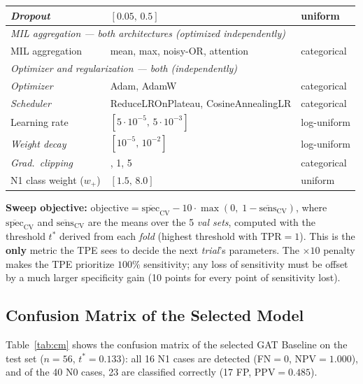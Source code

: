 \documentclass[10pt,a4paper,twocolumn,twoside]{article}
\begin{document}
\begin{table}[H]
\begin{tabular}{p{5.0cm}>{\raggedleft\arraybackslash}p{5.3cm}>{\raggedleft\arraybackslash}p{3.0cm}}
\textit{Dropout}                            & $[0.05,\,0.5]$                         & uniform \\
\midrule
\multicolumn{3}{l}{\textit{MIL aggregation --- both architectures (optimized independently)}} \\[2pt]
MIL aggregation                               & mean, max, noisy-OR, attention             & categorical \\
\midrule
\multicolumn{3}{l}{\textit{Optimizer and regularization --- both (independently)}} \\[2pt]
\textit{Optimizer}                          & Adam, AdamW                                & categorical \\
\textit{Scheduler}                          & ReduceLROnPlateau, CosineAnnealingLR       & categorical \\
Learning rate                           & $[5\cdot10^{-5},\,5\cdot10^{-3}]$         & log-uniform \\
\textit{Weight decay}                       & $[10^{-5},\,10^{-2}]$                      & log-uniform \\
\textit{Grad.\ clipping}                     & 0, 1, 5                                    & categorical \\
N1 class weight ($w_+$)                       & $[1.5,\,8.0]$                          & uniform \\
\bottomrule
\end{tabular}
\end{table}

\textbf{Sweep objective:}
$\text{objective} = \overline{\text{spec}}_{\text{CV}} - 10 \cdot \max(0,\; 1 - \overline{\text{sens}}_{\text{CV}})$,
where $\overline{\text{spec}}_{\text{CV}}$ and $\overline{\text{sens}}_{\text{CV}}$ are the means
over the 5 \textit{val sets}, computed with the threshold $t^*$ derived from each \textit{fold}
(highest threshold with TPR$=1$). This is the \textbf{only} metric the TPE sees to decide
the next \textit{trial}'s parameters. The $\times 10$ penalty makes the TPE prioritize
$100\%$ sensitivity; any loss of sensitivity must be offset
by a much larger specificity gain (10 points for every point of sensitivity lost).

\subsection{Confusion Matrix of the Selected Model}
\label{app:cm}

Table~\ref{tab:cm} shows the confusion matrix of the selected GAT Baseline on the test set
($n\!=\!56$, $t^*\!=\!0.133$): all 16 N1 cases are detected (FN$=0$, NPV$=1.000$), and of the
40 N0 cases, 23 are classified correctly (17 FP, PPV$=0.485$).
\end{document}
